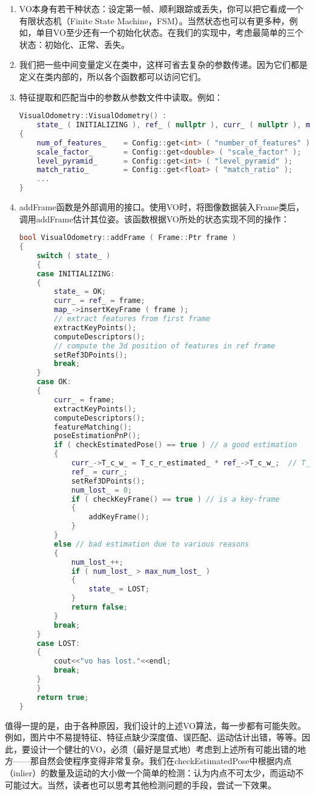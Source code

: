 \begin{enumerate}
	\item VO本身有若干种状态：设定第一帧、顺利跟踪或丢失，你可以把它看成一个有限状态机（Finite State Machine，FSM）。当然状态也可以有更多种，例如，单目VO至少还有一个初始化状态。在我们的实现中，考虑最简单的三个状态：初始化、正常、丢失。
	\item 我们把一些中间变量定义在类中，这样可省去复杂的参数传递。因为它们都是定义在类内部的，所以各个函数都可以访问它们。
	\item 特征提取和匹配当中的参数从参数文件中读取。例如：
\begin{lstlisting}[language=c++]
VisualOdometry::VisualOdometry() :
	state_ ( INITIALIZING ), ref_ ( nullptr ), curr_ ( nullptr ), map_ ( new Map ), num_lost_ ( 0 ), num_inliers_ ( 0 )
{
	num_of_features_    = Config::get<int> ( "number_of_features" );
	scale_factor_       = Config::get<double> ( "scale_factor" );
	level_pyramid_      = Config::get<int> ( "level_pyramid" );
	match_ratio_        = Config::get<float> ( "match_ratio" );
	...
}
	\end{lstlisting} 
	\item addFrame函数是外部调用的接口。使用VO时，将图像数据装入Frame类后，调用addFrame估计其位姿。该函数根据VO所处的状态实现不同的操作：
\begin{lstlisting}[language=c++]
bool VisualOdometry::addFrame ( Frame::Ptr frame )
{
	switch ( state_ )
	{
	case INITIALIZING:
	{
		state_ = OK;
		curr_ = ref_ = frame;
		map_->insertKeyFrame ( frame );
		// extract features from first frame 
		extractKeyPoints();
		computeDescriptors();
		// compute the 3d position of features in ref frame 
		setRef3DPoints();
		break;
	}
	case OK:
	{
		curr_ = frame;
		extractKeyPoints();
		computeDescriptors();
		featureMatching();
		poseEstimationPnP();
		if ( checkEstimatedPose() == true ) // a good estimation
		{
			curr_->T_c_w_ = T_c_r_estimated_ * ref_->T_c_w_;  // T_c_w = T_c_r*T_r_w 
			ref_ = curr_;
			setRef3DPoints();
			num_lost_ = 0;
			if ( checkKeyFrame() == true ) // is a key-frame
			{
				addKeyFrame();
			}
		}
		else // bad estimation due to various reasons
		{
			num_lost_++;
			if ( num_lost_ > max_num_lost_ )
			{
				state_ = LOST;
			}
			return false;
		}
		break;
	}
	case LOST:
	{
		cout<<"vo has lost."<<endl;
		break;
	}
	}
	return true;
}
\end{lstlisting}
\end{enumerate}

值得一提的是，由于各种原因，我们设计的上述VO算法，每一步都有可能失败。例如，图片中不易提特征、特征点缺少深度值、误匹配、运动估计出错，等等。因此，要设计一个健壮的VO，必须（最好是显式地）考虑到上述所有可能出错的地方——那自然会使程序变得非常复杂。我们在checkEstimatedPose中根据内点（inlier）的数量及运动的大小做一个简单的检测：认为内点不可太少，而运动不可能过大。当然，读者也可以思考其他检测问题的手段，尝试一下效果。


